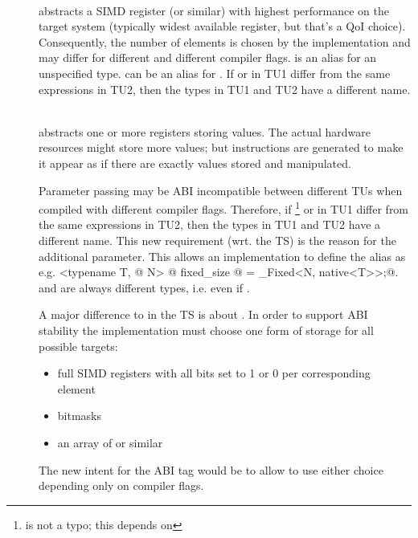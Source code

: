 \begin{description}
  \item[]\ \\
     abstracts a SIMD register (or similar) with highest performance on the target system (typically widest available register, but that's a QoI choice).
    Consequently, the number of elements is chosen by the implementation and may differ for different  and different compiler flags.
    \simdabi{} is an alias for an unspecified type.
    \simdabi{} can be an alias for \simdabi{}.
    If  or  in TU1 differ from the same expressions in TU2, then the types  in TU1 and TU2 have a different name.

  \item[]\ \\
     abstracts one or more registers storing  values.
    The actual hardware resources might store more values; but instructions are generated to make it appear as if there are exactly  values stored and manipulated.

    Parameter passing may be ABI incompatible between different TUs when compiled with different compiler flags.
    Therefore, if %
    \footnote{ is not a typo; this depends on \simdabi{}}
    or  in TU1
    differ from the same expressions in TU2, then the types  in TU1
    and TU2 have a different name.
    This new requirement (wrt. the TS) is the reason for the additional
     parameter.
    This allows an implementation to define the  alias as e.g.
    \lstinline@template <typename T, @
    \lstinline@int N> @
    \lstinline@using fixed_size @
    \lstinline@= _Fixed<N, native<T>>;@.
     and  are always different types, i.e. even if .

    A major difference to \stdx\simdabi{} in the TS is about .
    In order to support ABI stability the  implementation must choose one form of storage for all possible targets:
    \begin{itemize}
      \item full SIMD registers with all bits set to 1 or 0 per corresponding element
      \item bitmasks
      \item an array of  or similar
    \end{itemize}
    The new intent for the  ABI tag would be to allow  to use either choice depending only on compiler flags.


\end{description}
